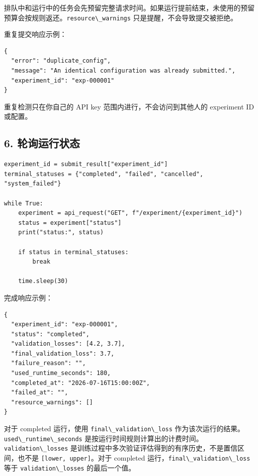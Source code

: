 \documentclass[
]{ctexart}
\newcommand{\passthrough}[1]{#1}
\begin{document}
排队中和运行中的任务会先预留完整请求时间。如果运行提前结束，未使用的预留预算会按规则返还。\passthrough{\lstinline!resource\_warnings!}
只是提醒，不会导致提交被拒绝。

重复提交响应示例：

\begin{verbatim}
{
  "error": "duplicate_config",
  "message": "An identical configuration was already submitted.",
  "experiment_id": "exp-000001"
}
\end{verbatim}

重复检测只在你自己的 API key 范围内进行，不会访问到其他人的 experiment
ID 或配置。

\hypertarget{ux8f6eux8be2ux8fd0ux884cux72b6ux6001}{%
\subsection{6.
轮询运行状态}\label{ux8f6eux8be2ux8fd0ux884cux72b6ux6001}}

\begin{verbatim}
experiment_id = submit_result["experiment_id"]
terminal_statuses = {"completed", "failed", "cancelled", "system_failed"}

while True:
    experiment = api_request("GET", f"/experiment/{experiment_id}")
    status = experiment["status"]
    print("status:", status)

    if status in terminal_statuses:
        break

    time.sleep(30)
\end{verbatim}

完成响应示例：

\begin{verbatim}
{
  "experiment_id": "exp-000001",
  "status": "completed",
  "validation_losses": [4.2, 3.7],
  "final_validation_loss": 3.7,
  "failure_reason": "",
  "used_runtime_seconds": 180,
  "completed_at": "2026-07-16T15:00:00Z",
  "failed_at": "",
  "resource_warnings": []
}
\end{verbatim}

对于 completed 运行，使用
\passthrough{\lstinline!final\_validation\_loss!}
作为该次运行的结果。\passthrough{\lstinline!used\_runtime\_seconds!}
是按运行时间规则计算出的计费时间。
\passthrough{\lstinline!validation\_losses!}
是训练过程中多次验证评估得到的有序历史，不是置信区间，也不是
\passthrough{\lstinline![lower, upper]!}。对于 completed
运行，\passthrough{\lstinline!final\_validation\_loss!} 等于
\passthrough{\lstinline!validation\_losses!} 的最后一个值。
\end{document}
